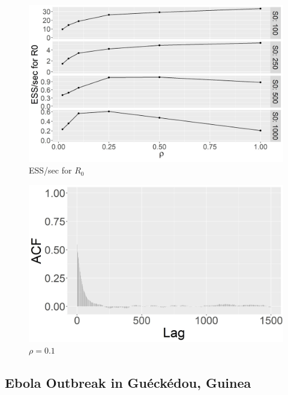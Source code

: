 \documentclass[11pt]{article}
\begin{document}
	\begin{figure}
		\centering
		\includegraphics[scale = 0.4]{E3_facet_ESSsecR0}
		\caption{ESS/sec for $R_0$
		}
		\label{fig:ESS_sec}
	\end{figure}			
	
	
	\begin{figure}
		\centering	
		\centering
		\includegraphics[width=\textwidth]{E1_burn_R0_acf}
		\caption{$\rho = 0.1$}
		\label{fig:acf}
	\end{figure}
	
	
	\subsection{Ebola Outbreak in Gu\'eck\'edou, Guinea}
	\label{sec:ebo}
	
\end{document}
